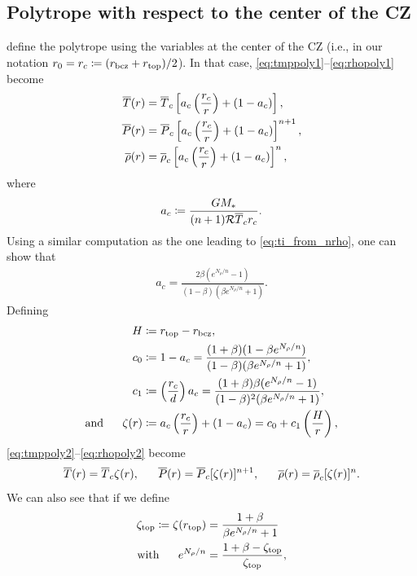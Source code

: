 \documentclass[12pt]{article}
\numberwithin{equation}{section}
\begin{document}
\subsection{Polytrope with respect to the center of the CZ}
\citet{Jones2011} define the polytrope using the variables at the center of the CZ (i.e., in our notation $r_0=r_c\coloneqq(r_{\rm{bcz}}+r_{\rm{top}})/2$). In that case, \eqref{eq:tmppoly1}--\eqref{eq:rhopoly1} become
\begin{align}
	\overline{T}(r) &= \overline{T}_c\left[a_c\left(\frac{r_c}{r}\right) + (1 - a_c)\right],\label{eq:tmppoly2}\\
	\overline{P}(r) &= \overline{P}_c\left[a_c\left(\frac{r_c}{r}\right) + (1 - a_c)\right]^{n+1},\label{eq:ppoly2}\\
	\overline{\rho}(r) &= \overline{\rho}_c\left[a_c\left(\frac{r_c}{r}\right) + (1 - a_c)\right]^n,\label{eq:rhopoly2}
\end{align} 
where 
\begin{align}
a_c \coloneqq \frac{GM_*}{(n+1)\mathcal{R} \overline{T}_c r_c}.
\label{eq:ac}
\end{align}
Using a similar computation as the one leading to \eqref{eq:ti_from_nrho}, one can show that 
\begin{align}
a_c = \frac{2\beta(e^{N_\rho/n}-1)}{(1-\beta)(\beta e^{N_\rho/n} + 1)}.
\label{eq:ac_fromn}
\end{align}
Defining 
\begin{align}
H&\coloneqq r_{\rm{top}}-r_{\rm{bcz}},\label{eq:d}\\
c_0&\coloneqq 1-a_c = \frac{(1+\beta)(1-\beta e^{N_\rho/n})}{(1-\beta)(\beta e^{N_\rho/n} + 1)}, \label{eq:c0}\\
c_1&\coloneqq \left(\frac{r_c}{d}\right)a_c = \frac{(1+\beta)\beta(e^{N_\rho/n}-1)}{(1-\beta)^2(\beta e^{N_\rho/n} + 1)},\label{eq:c1}\\
\text{and}\ \ \ \ \  \zeta(r) &\coloneqq a_c\left(\frac{r_c}{r}\right) + (1-a_c) = c_0 + c_1\left(\frac{H}{r}\right),\label{eq:zeta}
\end{align}
\eqref{eq:tmppoly2}--\eqref{eq:rhopoly2} become
\begin{align}
\tmpref\ofr=\tmpref_c\zeta(r),\ \ \ \ \ \prsref\ofr=\prsref_c[\zeta(r)]^{n+1},\ \ \ \ \ \rhoref\ofr=\rhoref_c[\zeta(r)]^n. 
\label{eq:polytrope3}
\end{align}
We can also see that if we define
\begin{subequations}
\begin{align}
\zeta_{\rm{top}} \coloneqq \zeta(r_{\rm{top}}) &= \frac{1+\beta}{\beta e^{N_\rho/n} + 1}\\
\text{with}\ \ \ \ \  e^{N_\rho/n}&=\frac{1+\beta-\zeta_{\rm{top}}}{\zeta_{\rm{top}}},
\end{align}
\end{subequations}
\end{document}
